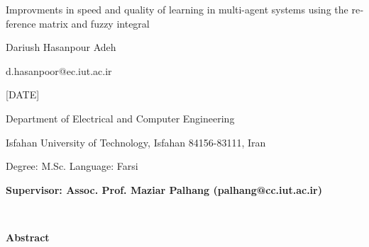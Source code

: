 \thispagestyle{empty}

\begin{latin}
\begin{center}

{\Huge Improvments in speed and quality of learning in multi-agent systems using the reference matrix and fuzzy integral}

\vspace{1cm}

{\LARGE{Dariush Hasanpour Adeh}}

\vspace{0.2cm}

{\small d.hasanpoor@ec.iut.ac.ir}

\vspace{0.5cm}

[DATE]

\vspace{0.5cm}

Department of Electrical and Computer Engineering

\vspace{0.2cm}

Isfahan University of Technology, Isfahan 84156-83111, Iran

\vspace{0.2cm}

Degree: M.Sc. \hspace*{3cm} Language: Farsi

\vspace{1cm}

{\small\textbf{Supervisor: Assoc. Prof. Maziar Palhang (palhang@cc.iut.ac.ir)}}
\end{center}
~\vfill



\noindent\textbf{Abstract}


\end{latin}
